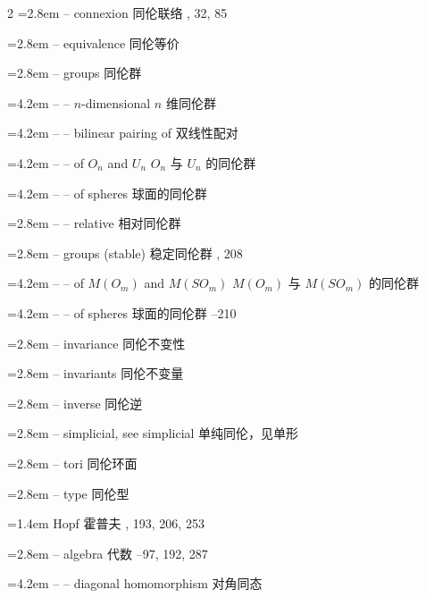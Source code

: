 \begin{multicols}{2}
\noindent\hangindent=2.8em -- connexion \quad 同伦联络 , 32, 85\par
\noindent\hangindent=2.8em -- equivalence \quad 同伦等价 \par
\noindent\hangindent=2.8em -- groups \quad 同伦群 \par
\noindent\hangindent=4.2em -- -- $n$-dimensional \quad $n$ 维同伦群 \par
\noindent\hangindent=4.2em -- -- bilinear pairing of \quad 双线性配对 \par
\noindent\hangindent=4.2em -- -- of $O_n$ and $U_n$ \quad $O_n$ 与 $U_n$ 的同伦群 \par
\noindent\hangindent=4.2em -- -- of spheres \quad 球面的同伦群 \par
\noindent\hangindent=2.8em -- -- relative \quad 相对同伦群 \par
\noindent\hangindent=2.8em -- groups (stable) \quad 稳定同伦群 , 208\par
\noindent\hangindent=4.2em -- -- of $M(O_m)$ and $M(SO_m)$ \quad $M(O_m)$ 与 $M(SO_m)$ 的同伦群 \par
\noindent\hangindent=4.2em -- -- of spheres \quad 球面的同伦群 --210\par
\noindent\hangindent=2.8em -- invariance \quad 同伦不变性 \par
\noindent\hangindent=2.8em -- invariants \quad 同伦不变量 \par
\noindent\hangindent=2.8em -- inverse \quad 同伦逆 \par
\noindent\hangindent=2.8em -- simplicial, see simplicial \quad 单纯同伦，见单形 \par
\noindent\hangindent=2.8em -- tori \quad 同伦环面 \par
\noindent\hangindent=2.8em -- type \quad 同伦型 \par
\noindent\hangindent=1.4em Hopf \quad 霍普夫 , 193, 206, 253\par
\noindent\hangindent=2.8em -- algebra \quad 代数 --97, 192, 287\par
\noindent\hangindent=4.2em -- -- diagonal homomorphism \quad 对角同态 \par

\end{multicols}
